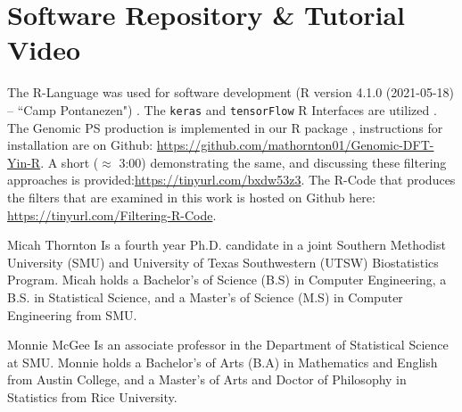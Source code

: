 \documentclass[10pt,conference]{IEEEtran}
\begin{document}
{\vspace{-0.5 em}
\section{Software Repository \& Tutorial Video}
\vspace{-0.5 em}

\noindent The R-Language was used for software development (R version 4.1.0 (2021-05-18) -- ``Camp Pontanezen") \cite{r21}.  The \texttt{keras} and \texttt{tensorFlow} R Interfaces are utilized \cite{kerR21,tfR21}.  The Genomic PS production is implemented in our R package \cite{dftR}, instructions for installation are on Github: \url{https://github.com/mathornton01/Genomic-DFT-Yin-R}. A short ($\approx$ 3:00) demonstrating the same, and discussing these filtering approaches is provided:\url{https://tinyurl.com/bxdw53z3}. The R-Code that produces the filters that are examined in this work is hosted on Github here: \url{https://tinyurl.com/Filtering-R-Code}.  
}

\pagebreak
\begin{IEEEbiographynophoto}{Micah Thornton}
Is a fourth year Ph.D. candidate in a joint Southern Methodist University (SMU) and University of Texas Southwestern (UTSW) Biostatistics Program.  Micah holds a Bachelor's of Science (B.S) in Computer Engineering, a B.S. in Statistical Science, and a Master's of Science (M.S) in Computer Engineering from SMU. 
\end{IEEEbiographynophoto}

\begin{IEEEbiographynophoto}{Monnie McGee} 
Is an associate professor in the Department of Statistical Science at SMU. Monnie holds a Bachelor's of Arts (B.A) in Mathematics and English from Austin College, and a Master's of Arts and Doctor of Philosophy in Statistics from Rice University.  

\end{IEEEbiographynophoto}
\end{document}
